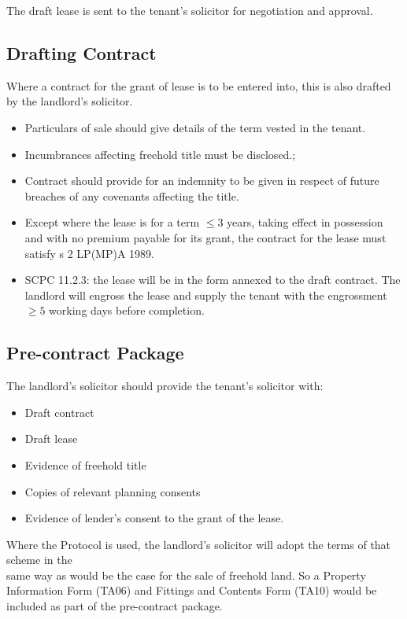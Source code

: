 \documentclass[
]{article}
\providecommand{\tightlist}{%
  \setlength{\itemsep}{0pt}\setlength{\parskip}{0pt}}
\begin{document}
The draft lease is sent to the tenant's solicitor for negotiation and
approval.

\hypertarget{drafting-contract}{%
\subsection{Drafting Contract}\label{drafting-contract}}

Where a contract for the grant of lease is to be entered into, this is
also drafted by the landlord's solicitor.

\begin{itemize}
\tightlist
\item
  Particulars of sale should give details of the term vested in the
  tenant.
\item
  Incumbrances affecting freehold title must be disclosed.;
\item
  Contract should provide for an indemnity to be given in respect of
  future breaches of any covenants affecting the title.
\item
  Except where the lease is for a term \(\leq 3\) years, taking effect
  in possession and with no premium payable for its grant, the contract
  for the lease must satisfy s 2 LP(MP)A 1989.
\item
  SCPC 11.2.3: the lease will be in the form annexed to the draft
  contract. The landlord will engross the lease and supply the tenant
  with the engrossment \(\geq 5\) working days before completion.
\end{itemize}

\hypertarget{pre-contract-package}{%
\subsection{Pre-contract Package}\label{pre-contract-package}}

The landlord's solicitor should provide the tenant's solicitor with:

\begin{itemize}
\tightlist
\item
  Draft contract
\item
  Draft lease
\item
  Evidence of freehold title
\item
  Copies of relevant planning consents
\item
  Evidence of lender's consent to the grant of the lease.
\end{itemize}

Where the Protocol is used, the landlord's solicitor will adopt the
terms of that scheme in the\\
same way as would be the case for the sale of freehold land. So a
Property Information Form (TA06) and Fittings and Contents Form (TA10)
would be included as part of the pre-contract package.
\end{document}
